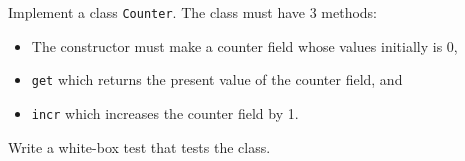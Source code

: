 Implement a class \texttt{Counter}. The class must have 3 methods:
\begin{itemize}
\item The constructor must make a counter field whose values initially is 0,
\item \lstinline{get} which returns the present value of the counter field, and
\item \lstinline{incr} which increases the counter field by 1.
\end{itemize}
Write a white-box test that tests the class.
